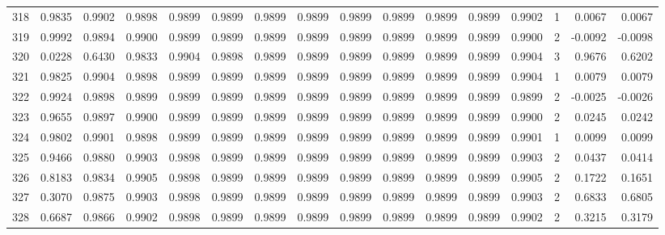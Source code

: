 \begin{tabular}{lrrrrrrrrrrrrrrr}
318 &      0.9835 &  0.9902 &  0.9898 &  0.9899 &  0.9899 &  0.9899 &  0.9899 &  0.9899 &  0.9899 &  0.9899 &   0.9899 &     0.9902 &      1 &                    0.0067 &                     0.0067 \\
319 &      0.9992 &  0.9894 &  0.9900 &  0.9899 &  0.9899 &  0.9899 &  0.9899 &  0.9899 &  0.9899 &  0.9899 &   0.9899 &     0.9900 &      2 &                   -0.0092 &                    -0.0098 \\
320 &      0.0228 &  0.6430 &  0.9833 &  0.9904 &  0.9898 &  0.9899 &  0.9899 &  0.9899 &  0.9899 &  0.9899 &   0.9899 &     0.9904 &      3 &                    0.9676 &                     0.6202 \\
321 &      0.9825 &  0.9904 &  0.9898 &  0.9899 &  0.9899 &  0.9899 &  0.9899 &  0.9899 &  0.9899 &  0.9899 &   0.9899 &     0.9904 &      1 &                    0.0079 &                     0.0079 \\
322 &      0.9924 &  0.9898 &  0.9899 &  0.9899 &  0.9899 &  0.9899 &  0.9899 &  0.9899 &  0.9899 &  0.9899 &   0.9899 &     0.9899 &      2 &                   -0.0025 &                    -0.0026 \\
323 &      0.9655 &  0.9897 &  0.9900 &  0.9899 &  0.9899 &  0.9899 &  0.9899 &  0.9899 &  0.9899 &  0.9899 &   0.9899 &     0.9900 &      2 &                    0.0245 &                     0.0242 \\
324 &      0.9802 &  0.9901 &  0.9898 &  0.9899 &  0.9899 &  0.9899 &  0.9899 &  0.9899 &  0.9899 &  0.9899 &   0.9899 &     0.9901 &      1 &                    0.0099 &                     0.0099 \\
325 &      0.9466 &  0.9880 &  0.9903 &  0.9898 &  0.9899 &  0.9899 &  0.9899 &  0.9899 &  0.9899 &  0.9899 &   0.9899 &     0.9903 &      2 &                    0.0437 &                     0.0414 \\
326 &      0.8183 &  0.9834 &  0.9905 &  0.9898 &  0.9899 &  0.9899 &  0.9899 &  0.9899 &  0.9899 &  0.9899 &   0.9899 &     0.9905 &      2 &                    0.1722 &                     0.1651 \\
327 &      0.3070 &  0.9875 &  0.9903 &  0.9898 &  0.9899 &  0.9899 &  0.9899 &  0.9899 &  0.9899 &  0.9899 &   0.9899 &     0.9903 &      2 &                    0.6833 &                     0.6805 \\
328 &      0.6687 &  0.9866 &  0.9902 &  0.9898 &  0.9899 &  0.9899 &  0.9899 &  0.9899 &  0.9899 &  0.9899 &   0.9899 &     0.9902 &      2 &                    0.3215 &                     0.3179 \\

\end{tabular}
